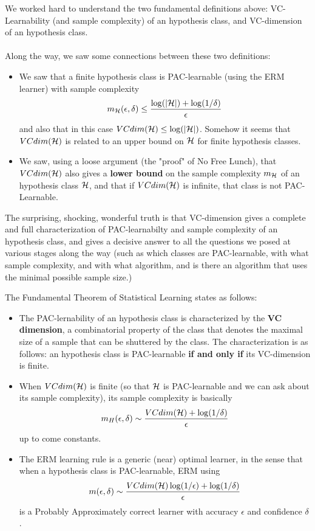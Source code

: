 We worked hard to understand the two fundamental definitions above: VC-Learnability (and sample complexity) of an hypothesis class, and VC-dimension of an hypothesis class. 
\\~\\
Along the way, we saw some connections between these two definitions:
\begin{itemize}
    \item We saw that a finite hypothesis class is PAC-learnable (using the ERM learner)
    with sample complexity \[m_{\mathcal{H}}(\epsilon,\delta)\leq \frac{\log(|\mathcal{H}|) + \log(1/\delta)}{\epsilon} \]
    and also that in this case $VCdim(\mathcal{H})\leq \log(|\mathcal{H}|)$. Somehow it seems that $VCdim(\mathcal{H})$ is related to an upper bound on $\mathcal{H}$ for finite hypothesis classes.
    \item We saw, using a loose argument (the "proof" of No Free Lunch), that $VCdim(\mathcal{H})$ also gives a {\bf lower bound} on the sample complexity $m_{\mathcal{H}}$ of an hypothesis class $\mathcal{H}$, and that if $VCdim(\mathcal{H})$ is infinite, that class is not PAC-Learnable. 
\end{itemize}

The surprising, shocking, wonderful truth is that VC-dimension gives a complete and full characterization of PAC-learnabilty and sample complexity of an hypothesis class, and gives a decisive answer to all the questions we posed at various stages along the way (such as which classes are PAC-learnable, with what sample complexity, and with what algorithm, and is there an algorithm that uses the minimal possible sample size.)

The Fundamental Theorem of Statistical Learning states as follows:
\begin{itemize}

\item The PAC-lernability of an hypothesis class is characterized by the \textbf{VC dimension}, a combinatorial property of the class that denotes the maximal size of a sample that can be shuttered by the class.  The characterization is as follows: an hypothesis class is PAC-learnable {\bf if and only if} its VC-dimension is finite.
\item When $VCdim(\mathcal{H})$ is finite (so that $\mathcal{H}$ is PAC-learnable and we can ask about its sample complexity), its sample complexity is basically 
\[
m_H(\epsilon,\delta) \sim \frac{VCdim(\mathcal{H})+\log(1/\delta)}{\epsilon}
\]
up to come constants. 
\item The ERM learning rule is a generic (near) optimal learner, in the sense that when a hypothesis class is PAC-learnable, ERM using 
\[
m(\epsilon,\delta) \sim  \frac{VCdim(\mathcal{H})\log(1/\epsilon)+\log(1/\delta)}{\epsilon}
\]
is a Probably Approximately correct learner with accuracy $\epsilon$ and confidence $\delta$.
\end{itemize}

